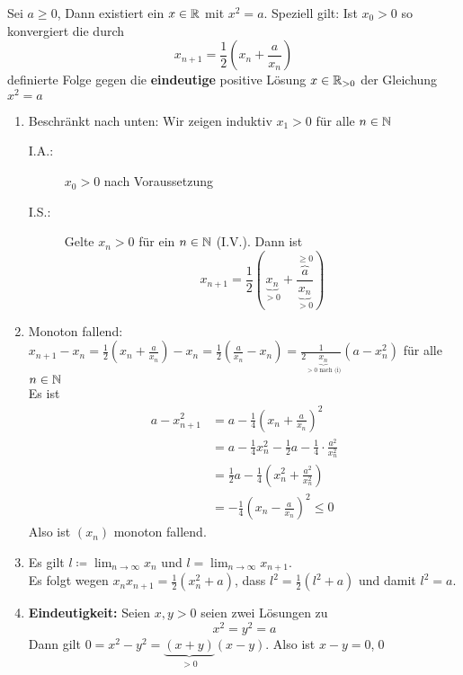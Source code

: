 \documentclass[consecutivenumbering]{gadsescript}
\begin{document}
\begin{subcorollary}
	Sei $ a\geq 0 $, Dann existiert ein $  x \in \mathbb{R} $ mit $ x^2 = a $. Speziell gilt:
	Ist $ x_0 > 0 $ so konvergiert die durch
	\[ x_{n+1} = \frac{1}{2} \left( x_n + \frac{a}{x_n} \right) \]
	definierte Folge gegen die \textbf{eindeutige} positive Lösung $ x \in \mathbb{R}_{>0} $ der Gleichung $ x^2 = a $
	\begin{subproof*}
		\begin{enumerate}[label=(\roman*)]
			\item Beschränkt nach unten: Wir zeigen induktiv $ x_1 > 0 $ für alle $ n \in \mathbb{N} $
				\begin{description}
					\item[I.A.:] $ x_0 > 0 $ nach Voraussetzung
					\item[I.S.:] Gelte $ x_n > 0 $ für ein $ n \in \mathbb{N} $ (I.V.). Dann ist
						\[ x_{n+1} = \frac{1}{2} \left( \underbrace{x_n}_{>0} + \frac{\overbrace{a}^{\geq0}}{\underbrace{x_n}_{>0}} \right) \]
				\end{description}
			\item Monoton fallend: $ x_{n+1} - x_n = \frac{1}{2} \left( x_n + \frac{a}{x_n} \right) - x_n = \frac{1}{2} \left( \frac{a}{x_n} - x_n \right) = \frac{1}{2\underbrace{x_n}_{>0 \text{ nach (i)}}} \left( a - x_n^2 \right) $ für alle $ n \in \mathbb{N} $\\
				Es ist
				\begin{align*}
					a- x_{n+1}^{2} &= a - \frac{1}{4} \left( x_n + \frac{a}{x_n} \right)^2\\
					~&= a - \frac{1}{4}x_n^2 - \frac{1}{2} a - \frac{1}{4} \cdot \frac{a^2}{x_n^2}\\
					~&= \frac{1}{2}a - \frac{1}{4}\left(x_n^2 + \frac{a^2}{x_n^2}\right)\\
					~&= - \frac{1}{4} \left( x_n - \frac{a}{x_n} \right)^2 \leq 0
				\end{align*}
				Also ist $(x_n)$ monoton fallend.
			\item Es gilt $ l \coloneqq \lim_{n\to\infty} x_n $ und $ l = \lim_{n\to\infty} x_{n+1} $.\\
				Es folgt wegen $ x_n x_{n+1} = \frac{1}{2} \left( x_n^2 + a \right) $, dass $ l^2 = \frac{1}{2} \left( l^2 + a \right) $ und damit $ l^2 = a $.
			\item \textbf{Eindeutigkeit:} Seien $ x, y > 0 $ seien zwei Lösungen zu
				\[ x^2 = y^2 = a \]
				Dann gilt $ 0 = x^2 - y^2 = \underbrace{(x+y)}_{>0}(x-y) $. Also ist $ x - y = 0 $,\qed
		\end{enumerate}
	\end{subproof*}
\end{subcorollary}
\end{document}

